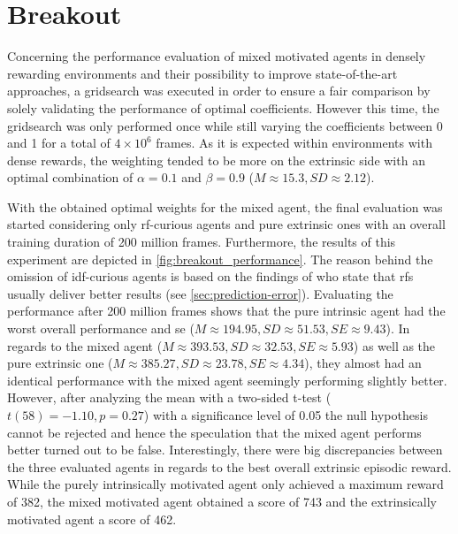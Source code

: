 \documentclass[draft,final]{vutinfth} %
\begin{document}
    \section{Breakout}

    Concerning the performance evaluation of mixed motivated agents in densely rewarding environments and their possibility to improve state-of-the-art approaches, a gridsearch was executed in order to ensure a fair comparison by solely validating the performance of optimal coefficients.
    However this time, the gridsearch was only performed once while still varying the coefficients between 0 and 1 for a total of $4\times10^6$ frames.
    As it is expected within environments with dense rewards, the weighting tended to be more on the extrinsic side with an optimal combination of $\alpha=0.1$ and $\beta=0.9$ ($M\approx15.3,SD\approx2.12$).

    With the obtained optimal weights for the mixed agent, the final evaluation was started considering only \gls{rf}-curious agents and pure extrinsic ones with an overall training duration of 200 million frames.
    Furthermore, the results of this experiment are depicted in \autoref{fig:breakout_performance}.
    The reason behind the omission of \gls{idf}-curious agents is based on the findings of \citet{burda_large-scale_2018-1} who state that \glspl{rf} usually deliver better results (see \autoref{sec:prediction-error}).
    Evaluating the performance after 200 million frames shows that the pure intrinsic agent had the worst overall performance and \gls{se} ($M\approx194.95,SD\approx51.53,SE\approx9.43$).
    In regards to the mixed agent ($M\approx393.53,SD\approx32.53,SE\approx5.93$) as well as the pure extrinsic one ($M\approx385.27,SD\approx23.78,SE\approx4.34$), they almost had an identical performance with the mixed agent seemingly performing slightly better.
    However, after analyzing the mean with a two-sided t-test ($t(58)=-1.10,p=0.27$) with a significance level of 0.05 the null hypothesis cannot be rejected and hence the speculation that the mixed agent performs better turned out to be false.
    Interestingly, there were big discrepancies between the three evaluated agents in regards to the best overall extrinsic episodic reward.
    While the purely intrinsically motivated agent only achieved a maximum reward of 382, the mixed motivated agent obtained a score of 743 and the extrinsically motivated agent a score of 462.
\end{document}
